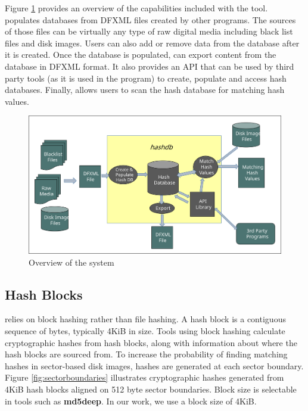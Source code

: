 \documentclass[11pt,fleqn]{article} %
\begin{document}
Figure \ref{fig:overviewFigure} provides an overview of the capabilities included with the \hash tool. \hash populates databases from DFXML files created by other programs. The sources of those files can be virtually any type of raw digital media including black list files and disk images. Users can also add or remove data from the database after it is created. Once the database is populated, \hash can export content from the database in DFXML format. It also provides an API that can be used by third party tools (as it is used in the \bulk program) to create, populate and access hash databases. Finally, \hash allows users to scan the hash database for matching hash values.\\
\begin{figure}
	\center
	\includegraphics[scale=.45]{drawings/hashdb_system_overview}
	\caption{Overview of the \hash system}
	\label{fig:overviewFigure}
\end{figure}

\subsection{Hash Blocks}
\hash relies on block hashing rather than file hashing. A hash block is a contiguous sequence of bytes, typically 4KiB in size. Tools using block hashing calculate cryptographic hashes from hash blocks, along with information about where the hash blocks are sourced from. To increase the probability of finding matching hashes in sector-based disk images, hashes are generated at each sector boundary. Figure \ref{fig:sectorboundaries} illustrates cryptographic hashes generated from 4KiB hash blocks aligned on 512 byte sector boundaries. Block size is selectable in tools such as \textbf{md5deep}. In our work, we use a block size of 4KiB.\\
\end{document}
